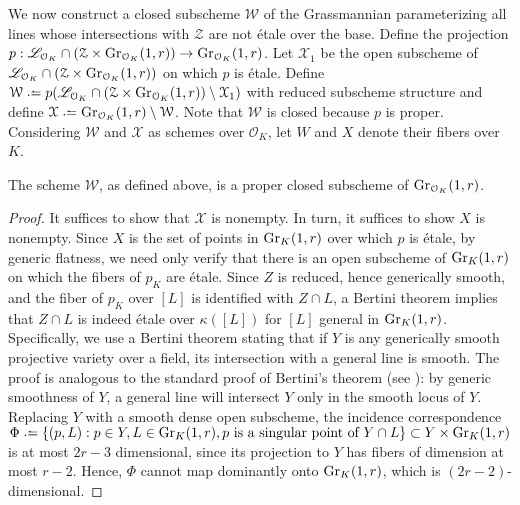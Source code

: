 We now construct a closed subscheme $\mathcal W$ of the Grassmannian parameterizing all lines whose intersections with $\mathcal Z$ are not \'etale over the base.
Define the projection $p: \mathscr L_{\mathcal O_K} \cap ( \mathcal Z \times \operatorname{Gr}_{\mathcal O_K}(1,r) ) \rightarrow \operatorname{Gr}_{\mathcal O_K}(1,r)$.
Let $\mathcal X_1$ be the open subscheme of $\mathscr L_{\mathcal O_K} \cap ( \mathcal Z \times \operatorname{Gr}_{\mathcal O_K}(1,r))$
on which $p$ is \'etale.
Define $\mathcal W \defeq  p(\mathscr L_{\mathcal O_K} \cap (\mathcal Z \times \gr {\mathcal O_K}(1,r) ) \setminus \mathcal X_1)$ with reduced subscheme structure and define
$\mathcal X \defeq \gr{\mathcal O_K}(1,r) \setminus \mathcal W$. Note that $\mathcal W$ is closed because $p$ is proper.
Considering $\mathcal W$ and $\mathcal X$ as schemes over $\mathcal O_K$, let $W$ and $X$ denote their fibers over $K$.

\begin{lemma}
	\label{lemma:nonempty-etale-locus}
	The scheme $\mathcal W$, as defined above, is a proper closed subscheme of $\operatorname{Gr}_{\mathcal O_K}(1,r)$.
\end{lemma}
\begin{proof}
It suffices to show that $\mathcal X$ is nonempty. In turn, it suffices to show $X$ is nonempty.
Since $X$ is the set of points in $\operatorname{Gr}_{K}(1,r)$ over which $p$ is \'etale,
by generic flatness, we need only verify that there is an open
subscheme of $\operatorname{Gr}_{K}(1,r)$ on which the fibers of $p_K$ are \'etale.
Since $Z$ is reduced, hence generically smooth, and the fiber of $p_K$ over $[L]$ is identified with
$Z \cap L$, a Bertini theorem implies that $Z \cap L$ is indeed \'etale over $\kappa([L])$ for $[L]$ general in $\operatorname{Gr}_{K}(1,r)$.
Specifically, we use a Bertini theorem stating that if $Y$ is any generically smooth projective variety over a field, its intersection with a general line is smooth.
The proof is analogous to the standard proof of Bertini's theorem (see \cite[12.4.2]{vakil:foundations-of-algebraic-geometry}): by generic smoothness of $Y$, a general line will intersect $Y$ only in the smooth locus of $Y$.
Replacing $Y$ with a smooth dense open subscheme, the incidence correspondence $\Phi \defeq \left\{ (p,L) : p \in Y, L \in \gr K(1,r), p \text{ is a singular point of } Y \cap L \right\} \subset Y \times \gr K (1,r)$
is at most $2r- 3$ dimensional, since its projection to $Y$ has fibers of dimension at most $r-2$. Hence, $\Phi$ cannot map dominantly onto $\operatorname{Gr}_{K}(1,r)$, which is $(2r-2)$-dimensional.
\end{proof}

